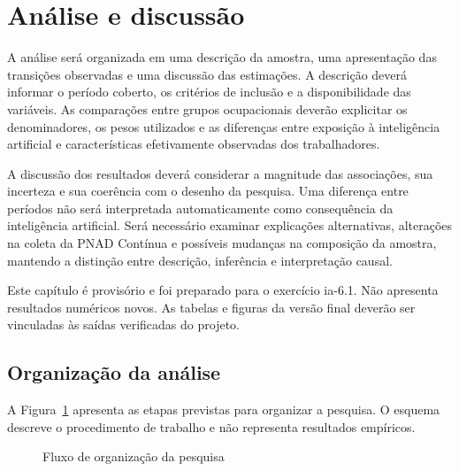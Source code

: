 \section{Análise e discussão}
\label{sec:analise}

A análise será organizada em uma descrição da amostra, uma apresentação das transições observadas e uma discussão das estimações. A descrição deverá informar o período coberto, os critérios de inclusão e a disponibilidade das variáveis. As comparações entre grupos ocupacionais deverão explicitar os denominadores, os pesos utilizados e as diferenças entre exposição à inteligência artificial e características efetivamente observadas dos trabalhadores.

A discussão dos resultados deverá considerar a magnitude das associações, sua incerteza e sua coerência com o desenho da pesquisa. Uma diferença entre períodos não será interpretada automaticamente como consequência da inteligência artificial. Será necessário examinar explicações alternativas, alterações na coleta da PNAD Contínua e possíveis mudanças na composição da amostra, mantendo a distinção entre descrição, inferência e interpretação causal.

Este capítulo é provisório e foi preparado para o exercício ia-6.1. Não apresenta resultados numéricos novos. As tabelas e figuras da versão final deverão ser vinculadas às saídas verificadas do projeto.
\subsection{Organização da análise}

A Figura~\ref{fig:fluxo-pesquisa-pnadc} apresenta as etapas previstas para organizar a pesquisa. O esquema descreve o procedimento de trabalho e não representa resultados empíricos.

\begin{figure}[htb]
  \caption{Fluxo de organização da pesquisa}
  \label{fig:fluxo-pesquisa-pnadc}
  \centering
\end{figure}

